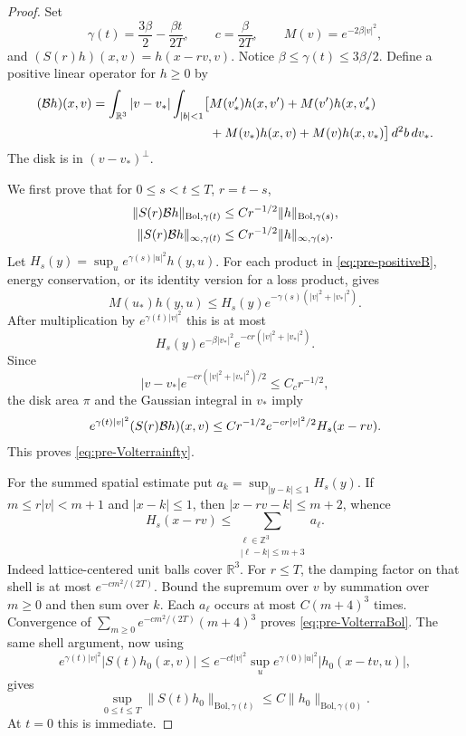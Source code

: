 \begin{proof}
Set
\[
 \gamma(t)=\frac{3\beta}{2}-\frac{\beta t}{2T},\qquad
 c=\frac{\beta}{2T},\qquad M(v)=e^{-2\beta|v|^2},
\]
and $(S(r)h)(x,v)=h(x-rv,v)$.
Notice $\beta\leq\gamma(t)\leq3\beta/2$.
Define a positive linear operator for $h\geq0$ by
\begin{equation}\label{eq:pre-positiveB}
 \begin{split}
 ({\cal B}h)(x,v)=\int_{\mathbb R^3}|v-v_*|\int_{|b|<1}
 \bigl[&M(v_*')h(x,v')+M(v')h(x,v_*')\\
       &+M(v_*)h(x,v)+M(v)h(x,v_*)\bigr]\,d^2b\,dv_* .
 \end{split}
\end{equation}
The disk is in $(v-v_*)^\perp$.

We first prove that for $0\leq s<t\leq T$, $r=t-s$,
\begin{align}
 \|S(r){\cal B}h\|_{\mathrm{Bol},\gamma(t)}
       &\leq Cr^{-1/2}\|h\|_{\mathrm{Bol},\gamma(s)},
                    \label{eq:pre-VolterraBol}\\
 \|S(r){\cal B}h\|_{\infty,\gamma(t)}
       &\leq Cr^{-1/2}\|h\|_{\infty,\gamma(s)}.
                    \label{eq:pre-Volterrainfty}
\end{align}
Let $H_s(y)=\sup_u e^{\gamma(s)|u|^2}h(y,u)$.
For each product in \eqref{eq:pre-positiveB}, energy conservation,
or its identity version for a loss product, gives
\[
 M(u_*)h(y,u)
       \leq H_s(y)e^{-\gamma(s)(|v|^2+|v_*|^2)}.
\]
After multiplication by $e^{\gamma(t)|v|^2}$ this is at most
\[
 H_s(y)e^{-\beta|v_*|^2}
                    e^{-cr(|v|^2+|v_*|^2)}.
\]
Since
\[
 |v-v_*|e^{-cr(|v|^2+|v_*|^2)/2}\leq C_c r^{-1/2},
\]
the disk area $\pi$ and the Gaussian integral in $v_*$ imply
\begin{equation}\label{eq:pre-spatialmajorant}
 e^{\gamma(t)|v|^2}(S(r){\cal B}h)(x,v)
       \leq Cr^{-1/2}e^{-cr|v|^2/2}H_s(x-rv).
\end{equation}
This proves \eqref{eq:pre-Volterrainfty}.

For the summed spatial estimate put
$a_k=\sup_{|y-k|\leq1}H_s(y)$.
If $m\leq r|v|<m+1$ and $|x-k|\leq1$, then
$|x-rv-k|\leq m+2$, whence
\[
 H_s(x-rv)\leq
       \sum_{\substack{\ell\in\mathbb Z^3\\|\ell-k|\leq m+3}}a_\ell.
\]
Indeed lattice-centered unit balls cover $\mathbb R^3$.
For $r\leq T$, the damping factor on that shell is at most
$e^{-cm^2/(2T)}$.
Bound the supremum over $v$ by summation over $m\geq0$ and then sum
over $k$. Each $a_\ell$ occurs at most $C(m+4)^3$ times.
Convergence of
$\sum_{m\geq0}e^{-cm^2/(2T)}(m+4)^3$ proves
\eqref{eq:pre-VolterraBol}.
The same shell argument, now using
\[
 e^{\gamma(t)|v|^2}|S(t)h_0(x,v)|
 \leq e^{-ct|v|^2}
       \sup_u e^{\gamma(0)|u|^2}|h_0(x-tv,u)|,
\]
gives
\begin{equation}\label{eq:pre-freebound}
 \sup_{0\leq t\leq T}\|S(t)h_0\|_{\mathrm{Bol},\gamma(t)}
       \leq C\|h_0\|_{\mathrm{Bol},\gamma(0)}.
\end{equation}
At $t=0$ this is immediate.


\end{proof}
